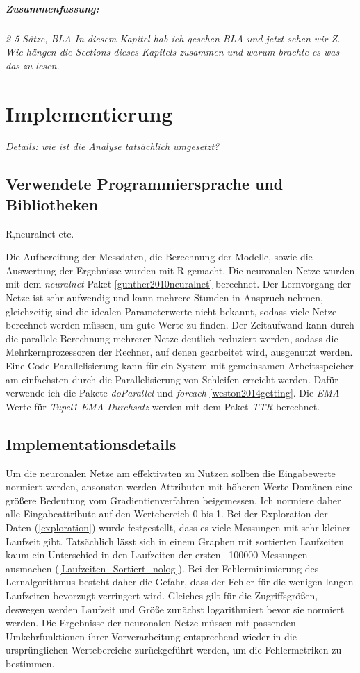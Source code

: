 \documentclass[
	12pt,
	a4paper,
	BCOR10mm,
	DIV14,
	listof=totoc,
	bibliography=totoc,
	headsepline
]{scrreprt}
\begin{document}
\paragraph{Zusammenfassung:}
\textit{2-5 Sätze, BLA In diesem Kapitel hab ich gesehen BLA und jetzt sehen wir Z. Wie hängen die Sections dieses Kapitels zusammen und warum brachte es was das zu lesen.}\\


\chapter{Implementierung}
\textit{%
	Details: wie ist die Analyse tatsächlich umgesetzt?
}
\bigskip

\section{Verwendete Programmiersprache und Bibliotheken}
R,neuralnet etc.

Die Aufbereitung der Messdaten, die Berechnung der Modelle, sowie die Auswertung der Ergebnisse wurden mit R gemacht.
Die neuronalen Netze wurden mit dem \textit{neuralnet} Paket \ref{gunther2010neuralnet} berechnet. Der Lernvorgang der Netze ist sehr aufwendig und kann mehrere Stunden in Anspruch nehmen, gleichzeitig sind die idealen Parameterwerte nicht bekannt, sodass viele Netze berechnet werden müssen, um gute Werte zu finden. Der Zeitaufwand kann durch die parallele Berechnung mehrerer Netze deutlich reduziert werden, sodass die Mehrkernprozessoren der Rechner, auf denen gearbeitet wird, ausgenutzt werden. Eine Code-Parallelisierung kann für ein System mit gemeinsamen Arbeitsspeicher am einfachsten durch die Parallelisierung von Schleifen erreicht werden. Dafür verwende ich die Pakete \textit{doParallel} und \textit{foreach} \ref{weston2014getting}.
Die \textit{EMA}-Werte für \textit{Tupel1 EMA Durchsatz} werden mit dem Paket \textit{TTR} berechnet.

\section{Implementationsdetails}
Um die neuronalen Netze am effektivsten zu Nutzen sollten die Eingabewerte normiert werden, ansonsten werden Attributen mit höheren Werte-Domänen eine größere Bedeutung vom Gradientienverfahren beigemessen. Ich normiere daher alle Eingabeattribute auf den Wertebereich 0 bis 1. Bei der Exploration der Daten (\ref{exploration}) wurde festgestellt, dass es viele Messungen mit sehr kleiner Laufzeit gibt. Tatsächlich lässt sich in einem Graphen mit sortierten Laufzeiten kaum ein Unterschied in den Laufzeiten der ersten ~100000 Messungen ausmachen (\ref{Laufzeiten_Sortiert_nolog}). Bei der Fehlerminimierung des Lernalgorithmus besteht daher die Gefahr, dass der Fehler für die wenigen langen Laufzeiten bevorzugt verringert wird. Gleiches gilt für die Zugriffsgrößen, deswegen werden Laufzeit und Größe zunächst logarithmiert bevor sie normiert werden.
Die Ergebnisse der neuronalen Netze müssen mit passenden Umkehrfunktionen ihrer Vorverarbeitung entsprechend wieder in die ursprünglichen Wertebereiche zurückgeführt werden, um die Fehlermetriken zu bestimmen.
\end{document}
